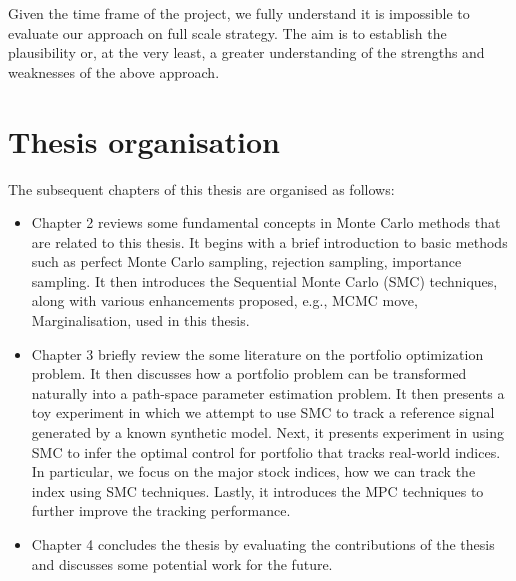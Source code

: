 Given the time frame of the project, we fully understand it is impossible to evaluate our approach on full scale strategy. The aim is to establish the plausibility or, at the very least, a greater understanding of the strengths and weaknesses of the above approach.

\section{Thesis organisation}
The subsequent chapters of this thesis are organised as follows:
\begin{itemize}
\item Chapter 2 reviews some fundamental concepts in Monte Carlo methods that are related to this thesis. It begins with a brief introduction to basic methods such as perfect Monte Carlo sampling, rejection sampling, importance sampling. It then  introduces the Sequential Monte Carlo (SMC) techniques, along with various enhancements proposed, e.g., MCMC move, Marginalisation, used in this thesis.
\item Chapter 3 briefly review the some literature on the portfolio optimization problem. It then discusses how a portfolio problem can be transformed naturally into a path-space parameter estimation problem. It then presents a toy experiment in which we attempt to use SMC to track a reference signal generated by a known synthetic model. Next, it presents experiment in using SMC to infer the optimal control for portfolio that tracks real-world indices. In particular, we focus on the major stock indices, how we can track the index using SMC techniques. Lastly, it introduces the MPC techniques to further improve the tracking performance.
\item Chapter 4 concludes the thesis by evaluating the contributions of the thesis and discusses some potential work for the future.
\end{itemize}



